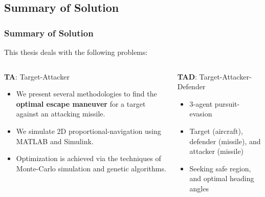 \documentclass{beamer}
\begin{document}
\subsection{Summary of Solution} 

\begin{frame}
\frametitle{Summary of Solution}
This thesis deals with the following problems: 
\begin{columns}[c]
	\begin{column}{.45\linewidth}
		\begin{block}{\textbf{TA}: Target-Attacker}
			\begin{itemize}
				\item We present several methodologies to find the \textbf{optimal escape maneuver} for a target against an attacking missile. 
				\item We simulate 2D proportional-navigation using MATLAB and Simulink.
				\item Optimization is achieved via the techniques of Monte-Carlo simulation and genetic algorithms.
			\end{itemize}
		\end{block}
	\end{column}
	\begin{column}{.55\linewidth}
		\begin{exampleblock}{\textbf{TAD}: Target-Attacker-Defender}
			\begin{itemize}
				\item 3-agent pursuit-evasion
				\item Target (aircraft), defender (missile), and attacker (missile)				
				\item Seeking safe region, and optimal heading angles
			\end{itemize}
		\end{exampleblock}
	\end{column}
\end{columns}
\end{frame}
\end{document}
